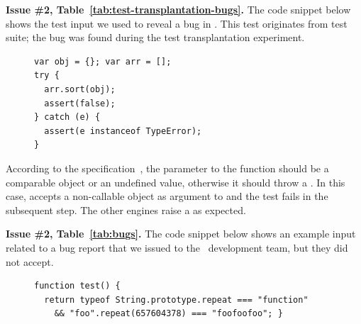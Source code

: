 \documentclass[10pt,conference,anonymous]{IEEEtran}
\begin{document}
\vspace{1ex}\noindent\textbf{Issue \#2,
  Table~\ref{tab:test-transplantation-bugs}.}  The code snippet below
shows the test input we used to reveal a bug in \jsc{}. This test
originates from \jerry{} test suite; the bug was found during the test
transplantation experiment.

\begin{figure}[h!]
  \centering
  \scriptsize
  \begin{lstlisting}
var obj = {}; var arr = [];
try {
  arr.sort(obj);
  assert(false);
} catch (e) {
  assert(e instanceof TypeError);
}
  \end{lstlisting}
  \normalsize
\end{figure}

According to the specification~\cite{ecmas262-array-sort}, the
parameter to the  function should be a comparable
object or an undefined value, otherwise it should throw a
. In this case, \jsc{} accepts a non-callable object
as argument to  and the test fails in the subsequent
step. The other engines raise a  as expected.

\vspace{1ex}\noindent\textbf{Issue \#2, Table~\ref{tab:bugs}.}  The
code snippet below shows an example input related to a bug report that
we issued to the \chakra\ development team, but they did not accept.

\begin{figure}[h!]
  \centering
  \scriptsize
  \begin{lstlisting}
function test() {
  return typeof String.prototype.repeat === "function"
    && "foo".repeat(657604378) === "foofoofoo"; }
  \end{lstlisting}
  \normalsize
\end{figure}
\end{document}
